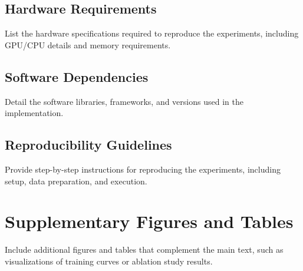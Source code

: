 \documentclass[
	english,
	ruledheaders=section,
	class=report,
	thesis={type=master},
	accentcolor=9c,
	custommargins=true,
	marginpar=false,
	parskip=half-,
	fontsize=11pt,
]{tudapub}
\begin{document}
\section{Hardware Requirements}
\label{app:hardware_requirements}
List the hardware specifications required to reproduce the experiments, including GPU/CPU details and memory requirements.

\section{Software Dependencies}
\label{app:software_dependencies}
Detail the software libraries, frameworks, and versions used in the implementation.

\section{Reproducibility Guidelines}
\label{app:reproducibility}
Provide step-by-step instructions for reproducing the experiments, including setup, data preparation, and execution.

\chapter{Supplementary Figures and Tables}
Include additional figures and tables that complement the main text, such as
visualizations of training curves or ablation study results.
\label{app:supplementary}
\end{document}
